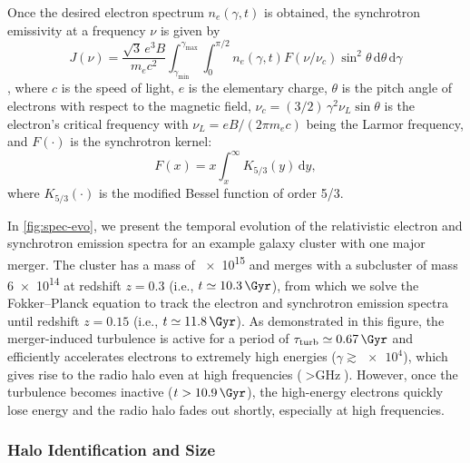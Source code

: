 \documentclass[twocolumn]{aastex62}
\newcommand{\R}[1]{\mathrm{#1}}
\newcommand{\D}[1]{\R{d} #1}
\begin{document}
Once the desired electron spectrum $n_e(\gamma, t)$ is obtained, the
synchrotron emissivity at a frequency $\nu$ is given by
\begin{equation}
  \label{sec:jnu-sync}
  J(\nu) = \frac{\sqrt{3} \, e^3 B}{m_e c^2}
    \!\int_{\gamma_{\R{min}}}^{\gamma_{\R{max}}} \!\!\!\int_0^{\pi/2}\!
    n_e(\gamma, t) F(\nu/\nu_c) \sin^2 \!\theta \,\D{\theta} \,\D{\gamma}
\end{equation}
\citep{rybicki1979},
where
$c$ is the speed of light,
$e$ is the elementary charge,
$\theta$ is the pitch angle of electrons with respect to the magnetic
field, $\nu_c = (3/2) \,\gamma^2 \nu_L \sin\theta$ is the electron's
critical frequency with $\nu_L = e B / (2\pi m_e c)$ being the Larmor
frequency, and $F(\cdot)$ is the synchrotron kernel:
\begin{equation}
  \label{eq:sync-kernel}
  F(x) = x \int_x^{\infty} K_{5/3}(y) \,\D{y} ,
\end{equation}
where $K_{5/3}(\cdot)$ is the modified Bessel function of order 5/3.

In \autoref{fig:spec-evo}, we present the temporal evolution of the
relativistic electron and synchrotron emission spectra for an example
galaxy cluster with one major merger.
The cluster has a mass of \SI{e15}{\solarmass} and merges with a
subcluster of mass \SI{6e14}{\solarmass} at redshift $z = 0.3$
(i.e., $t \simeq \SI{10.3}{\Gyr}$), from which we solve the Fokker--Planck
equation to track the electron and synchrotron emission spectra until
redshift $z = 0.15$ (i.e., $t \simeq \SI{11.8}{\Gyr}$).
As demonstrated in this figure, the merger-induced turbulence is active
for a period of $\tau_{\R{turb}} \simeq \SI{0.67}{\Gyr}$ and efficiently
accelerates electrons to extremely high energies
($\gamma \gtrsim \num{e4}$), which gives rise to the radio halo even at
high frequencies ($> \si{\GHz}$).
However, once the turbulence becomes inactive ($t > \SI{10.9}{\Gyr}$), the
high-energy electrons quickly lose energy and the radio halo fades out
shortly, especially at high frequencies.


\subsubsection{Halo Identification and Size}
\label{sec:halo-size}
\end{document}
